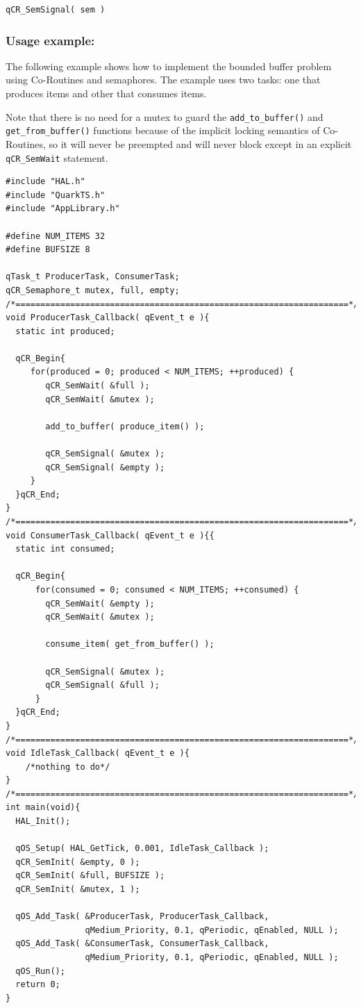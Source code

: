 \documentclass{article}
\begin{document}
\begin{lstlisting}[style=CStyle]
qCR_SemSignal( sem )
\end{lstlisting}


\subsubsection*{Usage example:}
The following example shows how to implement the bounded buffer problem using Co-Routines and semaphores. The example uses two tasks: one that produces items and other that consumes items.

Note that there is no need for a mutex to guard the \lstinline{add_to_buffer()} and \lstinline{get_from_buffer()} functions because of the implicit locking semantics of Co-Routines, so it will never be preempted and will never block except in an explicit \lstinline{qCR_SemWait} statement. \\

\begin{lstlisting}[style=CStyle]
#include "HAL.h"
#include "QuarkTS.h"
#include "AppLibrary.h"

#define NUM_ITEMS 32
#define BUFSIZE 8

qTask_t ProducerTask, ConsumerTask;
qCR_Semaphore_t mutex, full, empty;
/*===================================================================*/
void ProducerTask_Callback( qEvent_t e ){
  static int produced;
  
  qCR_Begin{
     for(produced = 0; produced < NUM_ITEMS; ++produced) {
        qCR_SemWait( &full );
        qCR_SemWait( &mutex );

        add_to_buffer( produce_item() );  
  
        qCR_SemSignal( &mutex );
        qCR_SemSignal( &empty );
     }
  }qCR_End;
}
/*===================================================================*/
void ConsumerTask_Callback( qEvent_t e ){{
  static int consumed;
  
  qCR_Begin{
      for(consumed = 0; consumed < NUM_ITEMS; ++consumed) {
        qCR_SemWait( &empty );
        qCR_SemWait( &mutex );    

        consume_item( get_from_buffer() );    

        qCR_SemSignal( &mutex ); 
        qCR_SemSignal( &full );
      }
  }qCR_End;
}
/*===================================================================*/
void IdleTask_Callback( qEvent_t e ){
    /*nothing to do*/
} 
/*===================================================================*/
int main(void){ 
  HAL_Init();

  qOS_Setup( HAL_GetTick, 0.001, IdleTask_Callback );
  qCR_SemInit( &empty, 0 );
  qCR_SemInit( &full, BUFSIZE );
  qCR_SemInit( &mutex, 1 );	
  
  qOS_Add_Task( &ProducerTask, ProducerTask_Callback,
                qMedium_Priority, 0.1, qPeriodic, qEnabled, NULL );
  qOS_Add_Task( &ConsumerTask, ConsumerTask_Callback,
                qMedium_Priority, 0.1, qPeriodic, qEnabled, NULL );
  qOS_Run(); 	
  return 0;
}
\end{lstlisting}
\end{document}

